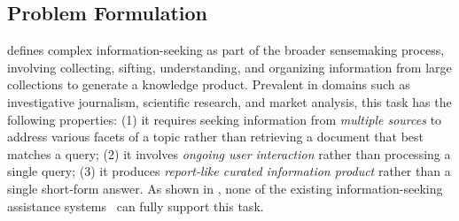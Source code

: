 

\subsection{Problem Formulation}
\label{sec:task_setup}

\citet{pirolli2009powers} defines complex information-seeking as part of the broader sensemaking process, involving collecting, sifting, understanding, and organizing information from large collections to generate a knowledge product. Prevalent in domains such as investigative journalism, scientific research, and market analysis, this task has the following properties: (1) it requires seeking information from \textit{multiple sources} to address various facets of a topic rather than retrieving a document that best matches a query; (2) it involves \textit{ongoing user interaction} rather than processing a single query; (3) it produces \textit{report-like curated information product} rather than a single short-form answer. As shown in , %
none of the existing information-seeking assistance systems~\citep[e.g.,][]{Robertson1977THEORIESAM,chen-etal-2017-reading,reddy-etal-2019-coqa,shao2024assisting} can  fully support this task.

